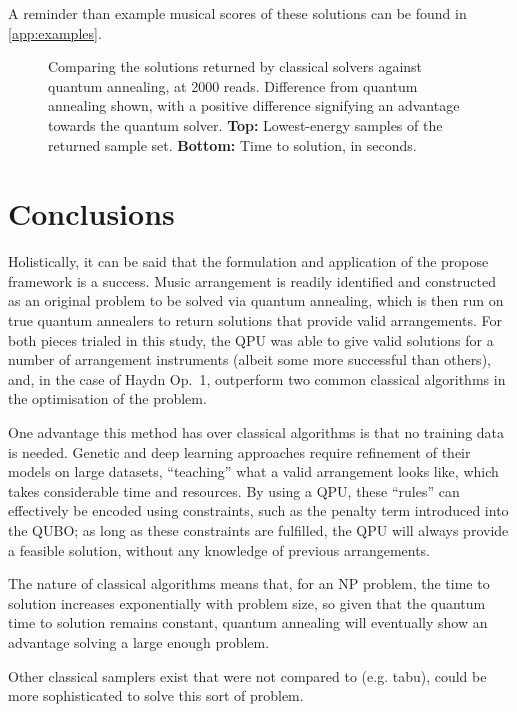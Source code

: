 \documentclass[12pt]{article}
\theoremstyle{definition}
\begin{document}
A reminder than example musical scores of these solutions can be found in \cref{app:examples}.

\begin{figure}[h]
    \centering\footnotesize
    
    \caption{Comparing the solutions returned by classical solvers against quantum annealing, at \num{2000} reads. Difference from quantum annealing shown, with a positive difference signifying an advantage towards the quantum solver. \textbf{Top:} Lowest-energy samples of the returned sample set. \textbf{Bottom:} Time to solution, in seconds.}
    \label{fig:scaling}
\end{figure}


\section{Conclusions}

Holistically, it can be said that the formulation and application of the propose framework is a success. Music arrangement is readily identified and constructed as an original problem to be solved via quantum annealing, which is then run on true quantum annealers to return solutions that provide valid arrangements. For both pieces trialed in this study, the QPU was able to give valid solutions for a number of arrangement instruments (albeit some more successful than others), and, in the case of Haydn Op.\ 1, outperform two common classical algorithms in the optimisation of the problem.

One advantage this method has over classical algorithms is that no training data is needed. Genetic and deep learning approaches require refinement of their models on large datasets, ``teaching'' what a valid arrangement looks like, which takes considerable time and resources. By using a QPU, these ``rules'' can effectively be encoded using constraints, such as the penalty term introduced into the QUBO; as long as these constraints are fulfilled, the QPU will always provide a feasible solution, without any knowledge of previous arrangements.

The nature of classical algorithms means that, for an NP problem, the time to solution increases exponentially with problem size, so given that the quantum time to solution remains constant, quantum annealing will eventually show an advantage solving a large enough problem.

Other classical samplers exist that were not compared to (e.g. tabu), could be more sophisticated to solve this sort of problem.
\end{document}

